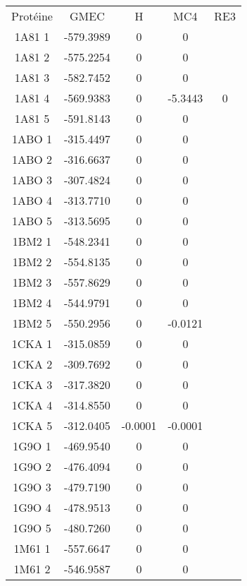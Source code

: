     \begin{table}[h]
      \centering

      \begin{tabular}{ccccc}


        
        \toprule
        Protéine & GMEC & H & MC4 & RE3 \\
        \cmidrule{1-5}
        1A81 1 & -579.3989 & 0 & 0 &  \\
        1A81 2 & -575.2254 & 0 & 0 &  \\
        1A81 3 & -582.7452 & 0 & 0 &  \\
        1A81 4 & -569.9383 & 0 & -5.3443 & 0 \\
        1A81 5 & -591.8143 & 0 & 0 &  \\
        1ABO 1 & -315.4497 & 0 & 0 &  \\
        1ABO 2 & -316.6637 & 0 & 0 &  \\
        1ABO 3 & -307.4824 & 0 & 0 &  \\
        1ABO 4 & -313.7710 & 0 & 0 &  \\
        1ABO 5 & -313.5695 & 0 & 0 &  \\
        1BM2 1 & -548.2341 & 0 & 0 &  \\
        1BM2 2 & -554.8135 & 0 & 0 &  \\
        1BM2 3 & -557.8629 & 0 & 0 &  \\
        1BM2 4 & -544.9791 & 0 & 0 &  \\
        1BM2 5 & -550.2956 & 0 & -0.0121 &  \\
        1CKA 1 & -315.0859 & 0 & 0 &  \\
        1CKA 2 & -309.7692 & 0 & 0 &  \\
        1CKA 3 & -317.3820 & 0 & 0 &  \\
        1CKA 4 & -314.8550 & 0 & 0 &  \\
        1CKA 5 & -312.0405 & -0.0001 & -0.0001 &  \\
        1G9O 1 & -469.9540 & 0 & 0 &  \\
        1G9O 2 & -476.4094 & 0 & 0 &  \\
        1G9O 3 & -479.7190 & 0 & 0 &  \\
        1G9O 4 & -478.9513 & 0 & 0 &  \\
        1G9O 5 & -480.7260 & 0 & 0 &  \\
        1M61 1 & -557.6647 & 0 & 0 &  \\
        1M61 2 & -546.9587 & 0 & 0 &  \\

\end{tabular}
\end{table}
